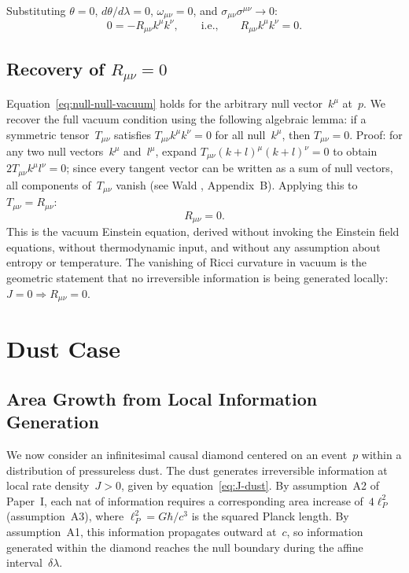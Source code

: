 \documentclass[12pt]{article}
\begin{document}
Substituting $\theta=0$, $d\theta/d\lambda=0$, $\omega_{\mu\nu}=0$,
and $\sigma_{\mu\nu}\sigma^{\mu\nu}\to 0$:
\begin{equation}
  0 = -R_{\mu\nu}k^\mu k^\nu,
  \qquad\text{i.e.,}\qquad
  R_{\mu\nu}k^\mu k^\nu = 0. \label{eq:null-null-vacuum}
\end{equation}

\subsection{Recovery of $R_{\mu\nu}=0$}

Equation~\eqref{eq:null-null-vacuum} holds for the
arbitrary null vector~$k^\mu$ at~$p$.
We recover the full vacuum condition using the following
algebraic lemma: if a symmetric tensor~$T_{\mu\nu}$ satisfies
$T_{\mu\nu}k^\mu k^\nu=0$ for all null~$k^\mu$, then
$T_{\mu\nu}=0$.
Proof: for any two null vectors~$k^\mu$ and~$l^\mu$,
expand $T_{\mu\nu}(k+l)^\mu(k+l)^\nu=0$ to obtain
$2T_{\mu\nu}k^\mu l^\nu=0$;
since every tangent vector can be written as a sum of null
vectors, all components of~$T_{\mu\nu}$ vanish
(see Wald \cite{Wald1984}, Appendix~B).
Applying this to $T_{\mu\nu}=R_{\mu\nu}$:
\begin{equation}
  R_{\mu\nu} = 0. \label{eq:vacuum-einstein}
\end{equation}
This is the vacuum Einstein equation, derived without invoking
the Einstein field equations, without thermodynamic input,
and without any assumption about entropy or temperature.
The vanishing of Ricci curvature in vacuum is the geometric
statement that no irreversible information is being generated
locally: $J=0 \Rightarrow R_{\mu\nu}=0$.

\section{Dust Case}
\label{sec:dust}

\subsection{Area Growth from Local Information Generation}

We now consider an infinitesimal causal diamond centered on an
event~$p$ within a distribution of pressureless dust.
The dust generates irreversible information at local rate
density~$J>0$, given by equation~\eqref{eq:J-dust}.
By assumption~A2 of Paper~I, each nat of information requires
a corresponding area increase of~$4\ell_P^2$ (assumption~A3),
where $\ell_P^2 = G\hbar/c^3$ is the squared Planck length.
By assumption~A1, this information propagates outward at~$c$,
so information generated within the diamond reaches the null
boundary during the affine interval~$\delta\lambda$.
\end{document}
